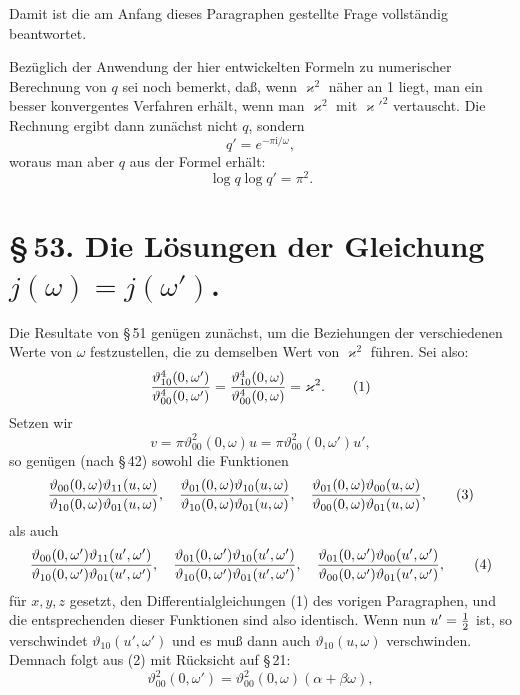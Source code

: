 \documentclass[11pt]{article}
\providecommand{\tht}{\vartheta}
\providecommand{\ii}{\mathrm{i}}
\begin{document}
Damit ist die am Anfang dieses Paragraphen gestellte Frage vollständig beantwortet.

Bezüglich der Anwendung der hier entwickelten Formeln zu numerischer Berechnung von $q$ sei noch bemerkt, daß, wenn $\varkappa^2$ näher an 1 liegt, man ein besser konvergentes Verfahren erhält, wenn man $\varkappa^2$ mit $\varkappa'^2$ vertauscht. Die Rechnung ergibt dann zunächst nicht $q$, sondern
\[
q'=e^{-\pi\ii/\omega},
\]
woraus man aber $q$ aus der Formel erhält:
\[
\log q\log q'=\pi^2.
\]

\section*{\S\,53. Die Lösungen der Gleichung $j(\omega)=j(\omega')$.}

Die Resultate von \S\,51 genügen zunächst, um die Beziehungen der verschiedenen Werte von $\omega$ festzustellen, die zu demselben Wert von $\varkappa^2$ führen. Sei also:
\begin{equation}
{\tht_{10}^4(0,\omega')\over\tht_{00}^4(0,\omega')}
={\tht_{10}^4(0,\omega)\over\tht_{00}^4(0,\omega)}=\varkappa^2.
\tag{1}
\end{equation}
Setzen wir
\begin{equation}
v=\pi\tht_{00}^2(0,\omega)u=\pi\tht_{00}^2(0,\omega')u',
\tag{2}
\end{equation}
so genügen (nach \S\,42) sowohl die Funktionen
\begin{equation}
{\tht_{00}(0,\omega)\tht_{11}(u,\omega)\over\tht_{10}(0,\omega)\tht_{01}(u,\omega)},\quad
{\tht_{01}(0,\omega)\tht_{10}(u,\omega)\over\tht_{10}(0,\omega)\tht_{01}(u,\omega)},\quad
{\tht_{01}(0,\omega)\tht_{00}(u,\omega)\over\tht_{00}(0,\omega)\tht_{01}(u,\omega)},
\tag{3}
\end{equation}
als auch
\begin{equation}
{\tht_{00}(0,\omega')\tht_{11}(u',\omega')\over\tht_{10}(0,\omega')\tht_{01}(u',\omega')},\quad
{\tht_{01}(0,\omega')\tht_{10}(u',\omega')\over\tht_{10}(0,\omega')\tht_{01}(u',\omega')},\quad
{\tht_{01}(0,\omega')\tht_{00}(u',\omega')\over\tht_{00}(0,\omega')\tht_{01}(u',\omega')},
\tag{4}
\end{equation}
für $x,y,z$ gesetzt, den Differentialgleichungen (1) des vorigen Paragraphen, und die entsprechenden dieser Funktionen sind also identisch. Wenn nun $u'={1\over2}$ ist, so verschwindet $\tht_{10}(u',\omega')$ und es muß dann auch $\tht_{10}(u,\omega)$ verschwinden. Demnach folgt aus (2) mit Rücksicht auf \S\,21:
\begin{equation}
\tht_{00}^2(0,\omega')=\tht_{00}^2(0,\omega)(\alpha+\beta\omega),
\tag{5}
\end{equation}
\end{document}
